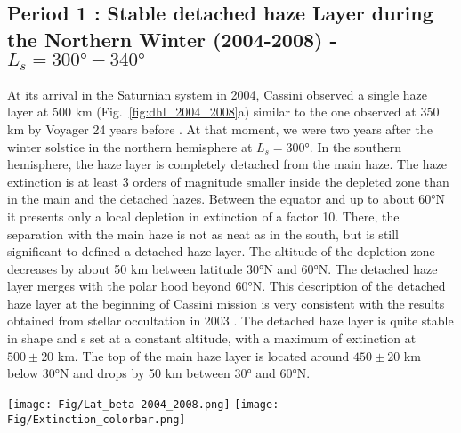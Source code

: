 \subsection{Period 1 : Stable detached haze Layer during the Northern Winter (2004-2008) - $L_s=\ang{300}-\ang{340}$}

At its arrival in the Saturnian system in 2004, Cassini observed a single haze layer at 500 km
(Fig.~\ref{fig:dhl_2004_2008}a) similar to the one observed at 350 km by Voyager 24 years before
\citep{Smith1981}. At that moment, we were two years after the winter solstice in the northern hemisphere at $L_s=\ang{300}$.
In the southern hemisphere, the haze layer is completely detached from the main haze. The haze extinction is at least
3 orders of magnitude smaller inside the depleted zone than in the main and the detached hazes. Between the equator
and up to about \ang{60}N it presents only a local depletion in extinction of a factor 10. There, the separation with
the main haze is not as neat as in the south, but is still significant to defined a detached haze layer. The altitude
of the depletion zone decreases by about 50 km between latitude \ang{30}N  and \ang{60}N. The detached haze layer
merges with the polar hood beyond \ang{60}N. This description of the detached haze layer at the beginning
of Cassini mission is very consistent with the results obtained from stellar occultation in 2003 \citep{Sicardy2006}.
The detached haze layer is quite stable in shape and s set at a constant altitude, with a maximum of extinction
at $500 \pm 20$ km. The top of the main haze layer is located around $450 \pm 20$ km below \ang{30}N and drops
by 50 km between \ang{30} and \ang{60}N.

\begin{figure*}[!ht]
    \centering
    \texttt{[image: Fig/Lat\_beta-2004\_2008.png]}
    \texttt{[image: Fig/Extinction\_colorbar.png]}\vspace{-.3cm}
    \caption{Latitudinal haze extinction profile ($\beta$) retrieved for 6 images taken between 2004 and 2008
    ($L_s=\ang{300}-\ang{340}$). The color schema extent is fixed for all the figures to make direct comparison
    between the different panels. The seasonal solar longitude ($L_s$) and the observation phase angle are
    also provided in each caption.}
    \label{fig:dhl_2004_2008}
\end{figure*}

